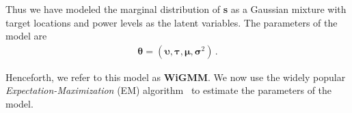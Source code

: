 Thus we have modeled the marginal distribution of {\bf s} as a Gaussian
mixture with target locations and power levels as the latent variables. The parameters of the model are 
\begin{align}
{\boldsymbol\theta} = \left( {\boldsymbol\upsilon} , {\boldsymbol\tau},  {\boldsymbol\mu} , {\boldsymbol\sigma}^2\right)\, .
\end{align}

Henceforth, we refer to this model as {\bf WiGMM}. We now use the widely popular \emph{Expectation-Maximization} (EM) algorithm~\cite{Dempster77maximumlikelihood, Borman_theexpectation, Bilmes97agentle, DinovIvoD, Bishop:2006:PRM:1162264} to estimate the parameters of the model.
